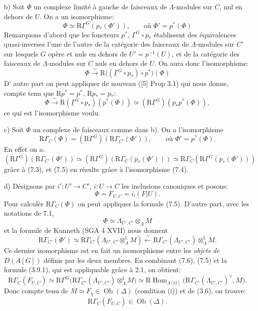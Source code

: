 \documentclass[11pt]{article}
\DeclareMathOperator{\Hom}{Hom}
\providecommand{\Hom}{\operatorname{Hom}}
\providecommand{\Hom}{\operatorname{Hom}}
\begin{document}
b) Soit $\Phi$ un complexe limité à gauche de faisceaux de $\Lambda$-modules sur $C$, nul en dehors de $U$. On a un isomorphisme:
\[
\Phi\simeq \mathrm{R}\underline{\Gamma}^G(p_*(\Phi')),
\qquad\text{où } \Phi'=p^*(\Phi)
\tag{7.4}
\]
Remarquons d'abord que les foncteurs $p^*$, $\underline{\Gamma}^G\circ p_*$ établissent des équivalences quasi-inverses l'une de l'autre de la catégorie des faisceaux de $\Lambda$-modules sur $C'$ sur lesquels $G$ opère et nuls en dehors de $U'=p^{-1}(U)$, et de la catégorie des faisceaux de $\Lambda$-modules sur $C$ nuls en dehors de $U$. On aura donc l'isomorphisme:
\[
\Phi\xrightarrow{\sim} \mathrm{R}\bigl((\underline{\Gamma}^G\circ p_*)\circ p^*\bigr)(\Phi)
\]
D'%
autre part on peut appliquer de nouveau ([5] Prop 3.1) qui nous donne, compte tenu que $\mathrm{R} p^*=p^*$, $\mathrm{R} p_*=p_*$:
\[
\Phi\xrightarrow{\sim} \mathrm{R}(\underline{\Gamma}^G\circ p_*)(p^*(\Phi))
\simeq (\mathrm{R}\underline{\Gamma}^G)(p_*p^*(\Phi)),
\]
ce qui est l'isomorphisme voulu.

c) Soit $\Phi$ un complexe de faisceaux comme dans b). On a l'isomorphisme
\[
\mathrm{R}\Gamma_C(\Phi)=(\mathrm{R}\Gamma^G)(\mathrm{R}\Gamma_{C'}(\Phi')),
\qquad\text{où } \Phi'=p^*(\Phi).
\tag{7.5}
\]
En effet on a:
\[
(\mathrm{R}\Gamma^G)(\mathrm{R}\Gamma_{C'}(\Phi'))
\simeq
(\mathrm{R}\Gamma^G)(\mathrm{R}\Gamma_C(p_*(\Phi')))
\simeq
\mathrm{R}\Gamma_C(\mathrm{R}\underline{\Gamma}^G(p_*(\Phi')))
\]
grâce à (7.3), et (7.5) en résulte grâce à l'isomorphisme (7.4).

d) Désignons par $i':U'\to C'$, $i:U\to C$ les inclusions canoniques et posons:
\[
\Phi=F_{U,C}=i_!(F|U).
\]
Pour calculèr $\mathrm{R}\Gamma_C(\Phi)$ on peut appliquer la formule (7.5). D'autre part, avec les notations de 7.1,
\[
\Phi\simeq \Lambda_{U',C'}\otimes_\Lambda M
\]
et la formule de Kunneth (SGA 4 XVII) nous donnent
\[
\mathrm{R}\Gamma_{C'}(\Phi')
\simeq
\mathrm{R}\Gamma_{C'}(\Lambda_{U',C'}\otimes_\Lambda^{\mathbb{L}} M)
\xleftarrow{\sim}
\mathrm{R}\Gamma_{C'}(\Lambda_{U',C'})\otimes_\Lambda^{\mathbb{L}} M.
\tag{7.6}
\]
Ce
dernier isomorphisme est en fait un isomorphisme entre les \emph{objets de} $D(A[G])$ définis par les deux membres. En combinant (7.6), (7.5) et la formule (3.9.1), qui est appliquable grâce à 2.1, on obtient:
\[
\mathrm{R}\Gamma_C(F_{U,C})
\simeq
\mathrm{R}\Gamma^G\bigl(\mathrm{R}\Gamma_{C'}(\Lambda_{U',C'})\otimes_\Lambda^{\mathbb{L}} M\bigr)
\simeq
\mathrm{R}\Hom_{\Lambda[G]}\bigl(\mathrm{R}\Gamma_{C'}(\Lambda_{U',C'})^\vee,M\bigr).
\tag{7.7}
\]
Donc compte tenu de $M\simeq F_{\bar\eta}\in\operatorname{Ob}(\Delta)$ (condition (i)) et de (3.6), on trouve:
\[
\mathrm{R}\Gamma_C(F_{U,C})\in\operatorname{Ob}(\Delta).
\]
\end{document}
